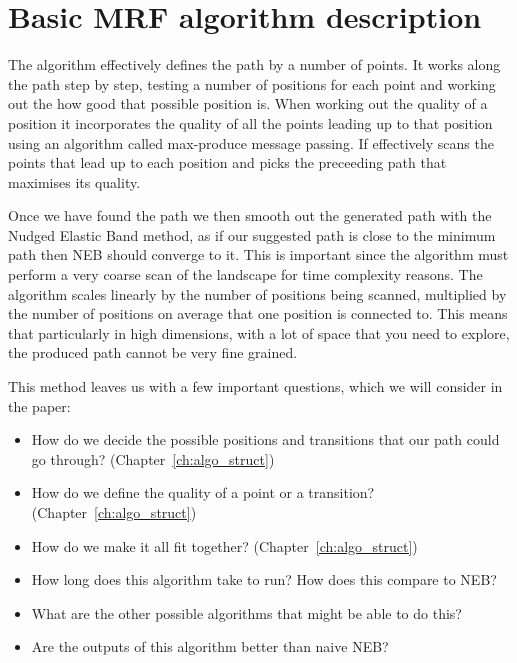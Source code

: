 \section{Basic MRF algorithm description}
\label{sec:basic_algo}
The algorithm effectively defines the path by a number of points.
It works along the path step by step, testing a number of positions for each point and working out the how good that possible position is.
When working out the quality of a position it incorporates the quality of all the points leading up to that position using an algorithm called max-produce message passing.
If effectively scans the points that lead up to each position and picks the preceeding path that maximises its quality.

Once we have found the path we then smooth out the generated path with the Nudged Elastic Band method, as if our suggested path is close to the minimum path then NEB should converge to it.
This is important since the algorithm must perform a very coarse scan of the landscape for time complexity reasons.
The algorithm scales linearly by the number of positions being scanned, multiplied by the number of positions on average that one position is connected to.
This means that particularly in high dimensions, with a lot of space that you need to explore, the produced path cannot be very fine grained.

This method leaves us with a few important questions, which we will consider in the paper:
\begin{itemize}
    \item How do we decide the possible positions and transitions that our path could go through? (Chapter~\ref{ch:algo_struct})
    \item How do we define the quality of a point or a transition? (Chapter~\ref{ch:algo_struct})
    \item How do we make it all fit together? (Chapter~\ref{ch:algo_struct})
    \item How long does this algorithm take to run?
    How does this compare to NEB?
    \item What are the other possible algorithms that might be able to do this?
    \item Are the outputs of this algorithm better than naive NEB?
\end{itemize}